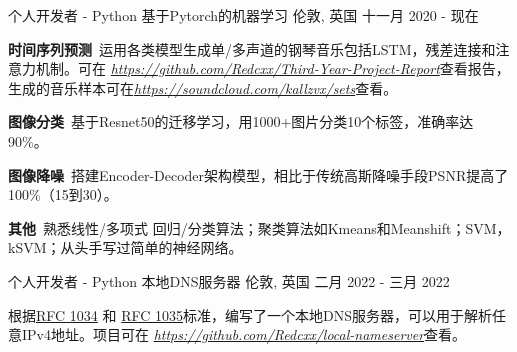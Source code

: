 \begin{cventries}
  \cventry
    {个人开发者 - Python} %
    {基于Pytorch的机器学习} %
    {伦敦, 英国} %
    {十一月 2020 - 现在} %
    {
      \begin{cvitems} %
      \item {\textbf{时间序列预测}\, 运用各类模型生成单/多声道的钢琴音乐包括LSTM，残差连接和注意力机制。可在 \href{https://github.com/Redcxx/Third-Year-Project-Report}{\textit{https://github.com/Redcxx/Third-Year-Project-Report}}查看报告，生成的音乐样本可在\href{https://soundcloud.com/kallzvx/sets}{\textit{https://soundcloud.com/kallzvx/sets}}查看。}
      \item {\textbf{图像分类}\, 基于Resnet50的迁移学习，用1000+图片分类10个标签，准确率达90\%。}
      \item {\textbf{图像降噪}\, 搭建Encoder-Decoder架构模型，相比于传统高斯降噪手段PSNR提高了100\%（15到30）。}
      \item {\textbf{其他}\, 熟悉线性/多项式 回归/分类算法；聚类算法如Kmeans和Meanshift；SVM，kSVM；从头手写过简单的神经网络。}
      \end{cvitems}
    }
    
  

  \cventry
    {个人开发者 - Python} %
    {本地DNS服务器} %
    {伦敦, 英国} %
    {二月 2022 - 三月 2022} %
    {
      \begin{cvitems} %
        \item {根据\href{https://datatracker.ietf.org/doc/html/rfc1034}{RFC 1034} 和 \href{https://datatracker.ietf.org/doc/html/rfc1035}{RFC 1035}标准，编写了一个本地DNS服务器，可以用于解析任意IPv4地址。项目可在 \href{https://github.com/Redcxx/local-nameserver}{\textit{https://github.com/Redcxx/local-nameserver}}查看。}
      \end{cvitems}
    }
    

\end{cventries}
